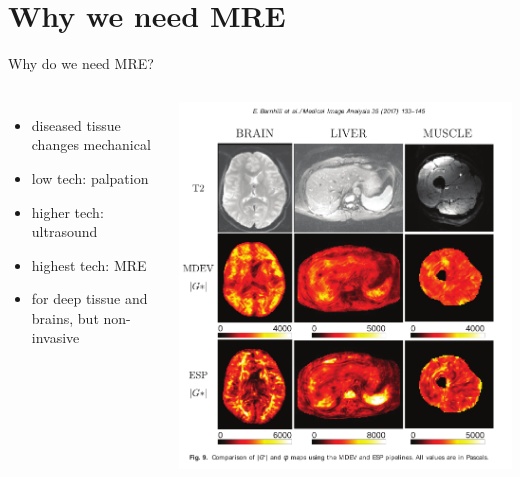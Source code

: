 

\section{Why we need MRE}

% 

\begin{frame}[t]{Why do we need MRE?}



\begin{columns}[T]
  \begin{itemize}
    \item<2-> diseased tissue changes mechanical
    \item<3-> low tech: palpation
    \item<4-> higher tech: ultrasound
    \item<5-> highest tech: MRE
    \item<6-> for deep tissue and brains, but non-invasive
  \end{itemize}

 	\vspace{-0.5cm}
	\includegraphics[width=\textwidth]{Images/Elasto-Tissue.pdf}

\end{columns}

\end{frame}



